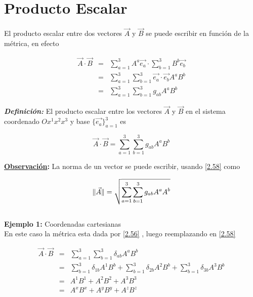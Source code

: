 \documentclass[12pt]{report}
\DeclarePairedDelimiter\norm{\lVert}{\rVert}
\begin{document}
\section{Producto Escalar}

El producto escalar entre dos vectores $\vec{A}$ y $\vec{B}$ se puede escribir en función de la métrica, en efecto

\begin{eqnarray} \nonumber
\vec{A} \cdot \vec{B} &=& \displaystyle\sum_{a=1}^3 A^a \vec{e_a} \cdot \displaystyle\sum_{b=1}^3 B^b \vec{e_b} \\ \nonumber
&=& \displaystyle\sum_{a=1}^3 \sum_{b=1}^3 \vec{e_a} \cdot \vec{e_b} A^a B^b \\ \nonumber
&=& \displaystyle\sum_{a=1}^3 \sum_{b=1}^3 g_{ab} A^a B^b \nonumber
\end{eqnarray}

\textbf{\textit{Definición:}} El producto escalar entre los vectores $\vec{A}$ y $\vec{B}$ en el sistema coordenado $O x^1 x^2 x^3$ y base $\{\vec{e_a}\}_{a=1}^3$ es

\begin{equation} \label{2.58}
\vec{A} \cdot \vec{B} = \displaystyle\sum_{a=1}^3 \sum_{b=1}^3 g_{ab} A^a B^b 
\end{equation}


\textbf{\underline{Observación}:} La norma de un vector se puede escribir, usando \eqref{2.58} como

\begin{equation} \label{2.59}
\norm{\vec{A}}=\sqrt{ \displaystyle\sum_{a=1}^3 \sum_{b=1}^3 g_{ab} A^a A^b }
\end{equation}
\\

\textbf{Ejemplo 1:} Coordenadas cartesianas \\

En este caso la métrica esta dada por \eqref{2.56} , luego reemplazando en \eqref{2.58} 

\begin{eqnarray}\nonumber
\vec{A} \cdot \vec{B}&=& \displaystyle\sum_{a=1}^3 \sum_{b=1}^3 \delta_{ab} A^a B^b\\ \nonumber
&=& \displaystyle\sum_{b=1}^3 \delta_{1b} A^1 B^b + \displaystyle\sum_{b=1}^3 \delta_{2b} A^2 B^b + \displaystyle\sum_{b=1}^3 \delta_{3b} A^3 B^b\\ \nonumber
&=& A^1 B^1 + A^2 B^2 + A^3 B^3 \\ \label{2.60}
&=& A^x B^x + A^y B^y + A^z B^z    
\end{eqnarray}
\end{document}
